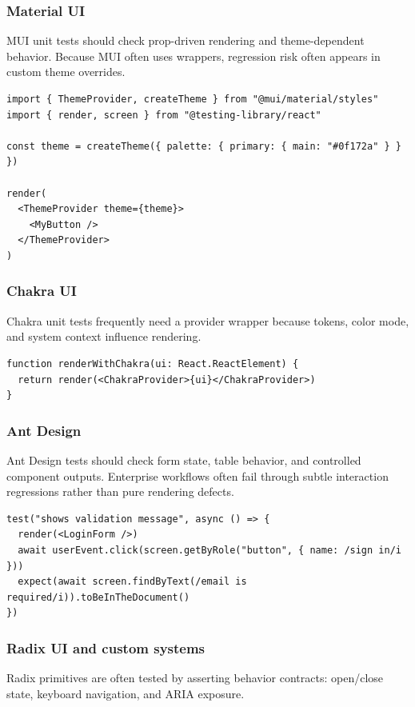 \subsubsection{Material UI}
MUI unit tests should check prop-driven rendering and theme-dependent behavior. Because MUI often uses wrappers, regression risk often appears in custom theme overrides.

\begin{verbatim}
import { ThemeProvider, createTheme } from "@mui/material/styles"
import { render, screen } from "@testing-library/react"

const theme = createTheme({ palette: { primary: { main: "#0f172a" } } })

render(
  <ThemeProvider theme={theme}>
    <MyButton />
  </ThemeProvider>
)
\end{verbatim}

\subsubsection{Chakra UI}
Chakra unit tests frequently need a provider wrapper because tokens, color mode, and system context influence rendering.

\begin{verbatim}
function renderWithChakra(ui: React.ReactElement) {
  return render(<ChakraProvider>{ui}</ChakraProvider>)
}
\end{verbatim}

\subsubsection{Ant Design}
Ant Design tests should check form state, table behavior, and controlled component outputs. Enterprise workflows often fail through subtle interaction regressions rather than pure rendering defects.

\begin{verbatim}
test("shows validation message", async () => {
  render(<LoginForm />)
  await userEvent.click(screen.getByRole("button", { name: /sign in/i }))
  expect(await screen.findByText(/email is required/i)).toBeInTheDocument()
})
\end{verbatim}

\subsubsection{Radix UI and custom systems}
Radix primitives are often tested by asserting behavior contracts: open/close state, keyboard navigation, and ARIA exposure.

